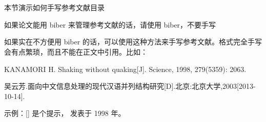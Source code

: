 \chapter{\bibname}

\begin{manref}
\item \label{ref:hint} 本节演示如何手写参考文献目录
\item 如果论文能用 biber 来管理参考文献的话，请使用 biber，不要手写
\item 如果实在不方便用 biber 的话，可以使用这种方法来手写参考文献。格式完全手写会有点繁琐，而且不能在正文中引用。比如：
\item \label{ref:man} KANAMORI H. Shaking without quaking[J]. Science, 1998, 279(5359): 2063.
\item 吴云芳.面向中文信息处理的现代汉语并列结构研究[D].北京:北京大学,2003[2013-10-14].
\end{manref}

示例：[\label{ref:hint}] 是个提示， 发表于 1998 年。
